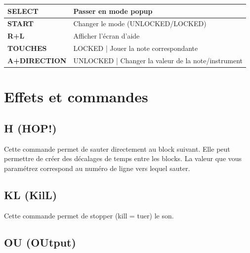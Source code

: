 \documentclass[12pt,a4paper]{article}
\begin{document}
        \tablelasttail{\hline}
        \begin{supertabular}{|l|p{11cm}|}
        \hline
            {\bf SELECT} & Passer en mode popup \\
            \hline
            {\bf START} & Changer le mode (UNLOCKED/LOCKED) \\
            \hline
            {\bf R+L} & Afficher l'écran d'aide \\
            \hline
            {\bf TOUCHES} & LOCKED | Jouer la note correspondante \\
            \hline
            {\bf A+DIRECTION} & UNLOCKED | Changer la valeur de la note/instrument \\
        \hline
        \end{supertabular}

  \section{Effets et commandes}


  \subsection{H (HOP!)}

    Cette commande permet de sauter directement au block suivant. Elle peut permettre de créer des décalages de temps entre les blocks. La valeur que vous paramétrez correspond au numéro de ligne vers lequel sauter.

  \subsection{KL (KilL)}

  Cette commande permet de stopper (kill = tuer) le son.

  \subsection{OU (OUtput)}
\end{document}
